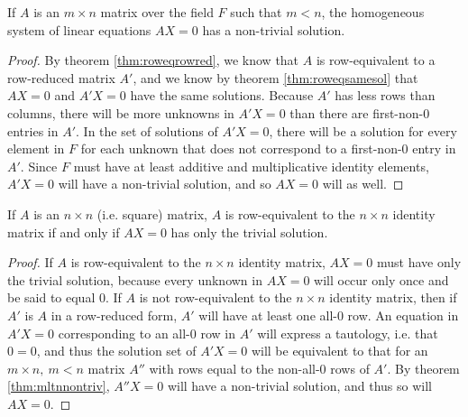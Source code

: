 \documentclass[12pt]{article}
\begin{document}
\begin{thm} \label{thm:mltnnontriv}
  If $A$ is an $m \times n$ matrix over the field $F$ such that
  $m < n$, the homogeneous system of linear equations $AX = 0$
  has a non-trivial solution.
  \begin{proof}
    By theorem \ref{thm:roweqrowred}, we know that $A$ is
    row-equivalent to a row-reduced matrix $A'$, and we know by
    theorem \ref{thm:roweqsamesol} that $AX = 0$ and $A'X = 0$
    have the same solutions. Because $A'$ has less rows than
    columns, there will be more unknowns in $A'X = 0$ than there
    are first-non-0 entries in $A'$. In the set of solutions of
    $A'X = 0$, there will be a solution for every element in $F$
    for each unknown that does not correspond to a first-non-0
    entry in $A'$. Since $F$ must have at least additive and
    multiplicative identity elements, $A'X = 0$ will have a
    non-trivial solution, and so $AX = 0$ will as well.
  \end{proof}
\end{thm}

\begin{thm} \label{thm:roweqtoidiffonlytriv}
  If $A$ is an $n \times n$ (i.e. square) matrix, $A$ is
  row-equivalent to the $n \times n$ identity matrix if and only
  if $AX = 0$ has only the trivial solution.
  \begin{proof}
    If $A$ is row-equivalent to the $n \times n$ identity matrix,
    $AX = 0$ must have only the trivial solution, because every
    unknown in $AX = 0$ will occur only once and be said to equal
    $0$. If $A$ is not row-equivalent to the $n \times n$
    identity matrix, then if $A'$ is $A$ in a row-reduced form,
    $A'$ will have at least one all-0 row. An equation in $A'X =
    0$ corresponding to an all-0 row in $A'$ will express a
    tautology, i.e. that $0 = 0$, and thus the solution set of
    $A'X = 0$ will be equivalent to that for an $m \times n,\ m <
    n$ matrix $A''$ with rows equal to the non-all-0 rows of
    $A'$. By theorem \ref{thm:mltnnontriv}, $A''X = 0$ will have
    a non-trivial solution, and thus so will $AX = 0$.
  \end{proof}
\end{thm}
\end{document}
